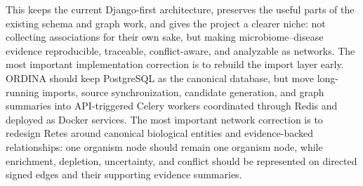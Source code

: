 \documentclass[11pt,a4paper]{article}
\begin{document}
This keeps the current Django-first architecture, preserves the useful parts of the existing schema and graph work, and gives the project a clearer niche: not collecting associations for their own sake, but making microbiome--disease evidence reproducible, traceable, conflict-aware, and analyzable as networks. The most important implementation correction is to rebuild the import layer early. ORDINA should keep PostgreSQL as the canonical database, but move long-running imports, source synchronization, candidate generation, and graph summaries into API-triggered Celery workers coordinated through Redis and deployed as Docker services. The most important network correction is to redesign Retes around canonical biological entities and evidence-backed relationships: one organism node should remain one organism node, while enrichment, depletion, uncertainty, and conflict should be represented on directed signed edges and their supporting evidence summaries.
\end{document}
